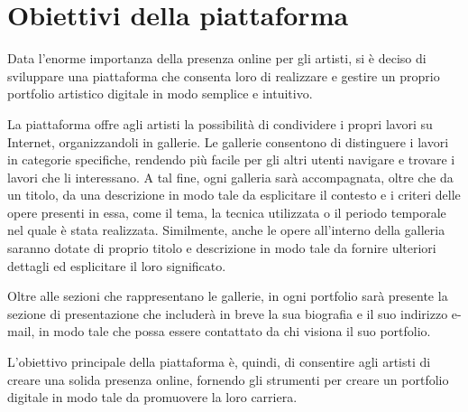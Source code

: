 \section{Obiettivi della piattaforma}\label{sez:obiettivi_della_piattaforma}
Data l'enorme importanza della presenza online per gli artisti, si \`e deciso di sviluppare una piattaforma che consenta loro di realizzare e gestire un proprio portfolio artistico digitale in modo semplice e intuitivo.

La piattaforma offre agli artisti la possibilit\`a di condividere i propri lavori su Internet, organizzandoli in gallerie. Le gallerie consentono di distinguere i lavori in categorie specifiche, rendendo pi\`u facile per gli altri utenti navigare e trovare i lavori che li interessano. A tal fine, ogni galleria sar\`a accompagnata, oltre che da un titolo, da una descrizione in modo tale da esplicitare il contesto e i criteri delle opere presenti in essa, come il tema, la tecnica utilizzata o il periodo temporale nel quale \`e stata realizzata. Similmente, anche le opere all'interno della galleria saranno dotate di proprio titolo e descrizione in modo tale da fornire ulteriori dettagli ed esplicitare il loro significato.

Oltre alle sezioni che rappresentano le gallerie, in ogni portfolio sar\`a presente la sezione di presentazione che includer\`a in breve la sua biografia e il suo indirizzo e-mail, in modo tale che possa essere contattato da chi visiona il suo portfolio.

L'obiettivo principale della piattaforma \`e, quindi, di consentire agli artisti di creare una solida presenza online, fornendo gli strumenti per creare un portfolio digitale in modo tale da promuovere la loro carriera.

